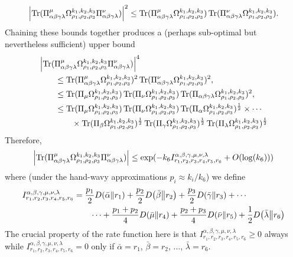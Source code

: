 \documentclass[notitlepage, 10pt]{article}
\begin{document}
\begin{equation}
    \left|\operatorname{Tr}(\Pi^{\mu}_{\alpha\beta\gamma\lambda} \Omega_{\rho_1,\rho_2,\rho_3}^{k_1, k_2, k_3} \Pi^{\nu}_{\alpha\beta\gamma\lambda})\right|^{2} \leq \operatorname{Tr}(\Pi^{\mu}_{\alpha\beta\gamma\lambda}\Omega_{\rho_1,\rho_2,\rho_3}^{k_1, k_2, k_3})\operatorname{Tr}(\Pi^{\nu}_{\alpha\beta\gamma\lambda}\Omega_{\rho_1,\rho_2,\rho_3}^{k_1, k_2, k_3}).
\end{equation}
Chaining these bounds together produces a (perhaps sub-optimal but nevertheless sufficient) upper bound
\begin{align}
    &\left|\operatorname{Tr}(\Pi^{\mu}_{\alpha\beta\gamma\lambda} \Omega_{\rho_1,\rho_2,\rho_3}^{k_1, k_2, k_3} \Pi^{\nu}_{\alpha\beta\gamma\lambda})\right|^4\\
    &\qquad\leq \operatorname{Tr}(\Pi^{\mu}_{\alpha\beta\gamma\lambda}\Omega_{\rho_1,\rho_2,\rho_3}^{k_1, k_2, k_3})^2\operatorname{Tr}(\Pi^{\nu}_{\alpha\beta\gamma\lambda}\Omega_{\rho_1,\rho_2,\rho_3}^{k_1, k_2, k_3})^2, \\
    &\qquad\leq \operatorname{Tr}(\Pi_{\mu}\Omega_{\rho_1,\rho_2,\rho_3}^{k_1, k_2, k_3})\operatorname{Tr}(\Pi_{\nu}\Omega_{\rho_1,\rho_2,\rho_3}^{k_1, k_2, k_3})\operatorname{Tr}(\Pi_{\alpha\beta\gamma\lambda}\Omega_{\rho_1,\rho_2,\rho_3}^{k_1, k_2, k_3})^2, \\
    &\qquad\leq \operatorname{Tr}(\Pi_{\mu}\Omega_{\rho_1,\rho_2,\rho_3}^{k_1, k_2, k_3})\operatorname{Tr}(\Pi_{\nu}\Omega_{\rho_1,\rho_2,\rho_3}^{k_1, k_2, k_3})\operatorname{Tr}(\Pi_{\alpha}\Omega_{\rho_1,\rho_2,\rho_3}^{k_1, k_2, k_3})^{\frac{1}{2}}\times \cdots \\
    &\qquad\qquad\times \operatorname{Tr}(\Pi_{\beta}\Omega_{\rho_1,\rho_2,\rho_3}^{k_1, k_2, k_3})^{\frac{1}{2}}\operatorname{Tr}(\Pi_{\gamma}\Omega_{\rho_1,\rho_2,\rho_3}^{k_1, k_2, k_3})^{\frac{1}{2}}\operatorname{Tr}(\Pi_{\lambda}\Omega_{\rho_1,\rho_2,\rho_3}^{k_1, k_2, k_3})^{\frac{1}{2}}
\end{align}
Therefore,
\begin{equation}
    \label{eq:sextuple_total_upper_bound}
    \left|\operatorname{Tr}(\Pi^{\mu}_{\alpha\beta\gamma\lambda} \Omega_{\rho_1,\rho_2,\rho_3}^{k_1, k_2, k_3} \Pi^{\nu}_{\alpha\beta\gamma\lambda})\right| \leq \exp( - k_6 I_{r_1, r_2, r_3, r_4, r_5, r_6}^{\alpha, \beta, \gamma, \mu, \nu, \lambda} + O(\log(k_6)))
\end{equation}
where (under the hand-wavy approximations $p_i \approx k_i/k_6$) we define
\begin{align}
    \begin{split}
        I_{r_1, r_2, r_3, r_4, r_5, r_6}^{\alpha, \beta, \gamma, \mu, \nu, \lambda}
        &= \frac{p_1}{2}D\!\left(\bar \alpha\middle\|r_1\right)+\frac{p_2}{2}D\!\left(\bar \beta\middle\|r_2\right)+\frac{p_3}{2}D\!\left(\bar \gamma\middle\|r_3\right)+\cdots \\
        &\qquad \cdots +\frac{p_1+p_2}{4}D\!\left(\bar \mu\middle\|r_4\right)+\frac{p_2+p_3}{4}D\!\left(\bar \nu\middle\|r_5\right)+\frac{1}{2}D\!\left(\bar \lambda\middle\|r_6\right)
    \end{split}
\end{align}
The crucial property of the rate function here is that $I_{r_1, r_2, r_3, r_4, r_5, r_6}^{\alpha, \beta, \gamma, \mu, \nu, \lambda} \geq 0$ always while $I_{r_1, r_2, r_3, r_4, r_5, r_6}^{\alpha, \beta, \gamma, \mu, \nu, \lambda} = 0$ only if $\bar \alpha = r_1$, $\bar \beta = r_2$, $\ldots$, $\bar \lambda = r_6$.
\end{document}
